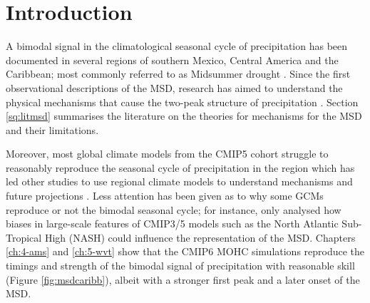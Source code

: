 
\section{Introduction}

A bimodal signal in the climatological seasonal cycle of precipitation has been documented in several regions of southern Mexico, Central America and the Caribbean; most commonly referred to as Midsummer drought  \citep[MSD][]{mosino1966,magana1999,gamble2008,perdigon2018,zhao2020}.  
Since the first observational descriptions of the MSD, research has aimed to understand the physical mechanisms that cause the two-peak structure of precipitation  \citep[e.g.][]{hastenrath1967,magana1999,curtis2002,herrera2015,maldonado2017,straffon2019,perdigon2019,zermeno2019}. 
Section \ref{sq:litmsd} summarises the literature on the theories for mechanisms for the MSD and their limitations.

Moreover, most global climate models from the CMIP5 cohort struggle to reasonably reproduce the seasonal cycle of precipitation in the region \citep{rauscher2008,ryu2014} which has led other studies to use regional climate models to understand mechanisms and future projections  \citep{fuentes2015inter,cavazos2020}.  
Less attention has been given as to why some GCMs reproduce or not the bimodal seasonal cycle; for instance, \cite{ryu2014} only analysed how biases in large-scale features of CMIP3/5 models such as the North Atlantic Sub-Tropical High (NASH) could influence the representation of the MSD.  
 Chapters \ref{ch:4-ams} and \ref{ch:5-wvt} show that the CMIP6 MOHC simulations reproduce the timings and strength of the bimodal signal of precipitation with reasonable skill (Figure \ref{fig:msdcaribb}), albeit with a stronger first peak and a later onset of the MSD. 

